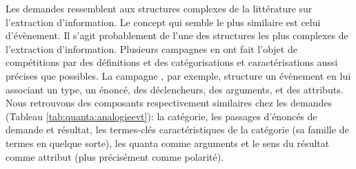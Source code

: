 Les demandes ressemblent aux structures complexes de la littérature sur l'extraction d'information. Le concept qui semble le plus similaire est celui d'évènement. Il s'agit probablement de l'une des structures les plus complexes de l'extraction d'information. Plusieurs campagnes en ont fait l'objet de compétitions par des définitions et des catégorisations et caractérisations aussi précises que possibles. La campagne \citep{ace2005event}, par exemple, structure un évènement en lui associant un type, un énoncé, des déclencheurs, des arguments, et des attributs. Nous retrouvons des composants respectivement similaires chez les demandes (Tableau \ref{tab:quanta:analogieevt}): la catégorie, les passages d'énoncés de demande et résultat, les termes-clés caractéristiques de la catégorie (sa famille de termes en quelque sorte), les quanta comme arguments et le sens du résultat comme attribut (plus précisément comme polarité).


